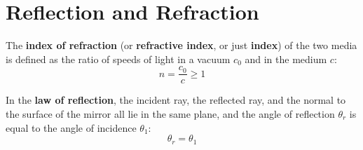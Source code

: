 \section{Reflection and Refraction}
%
The \textbf{index of refraction} (or \textbf{refractive index}, or just
\textbf{index}) of the two media is defined as the ratio of speeds of light in
a vacuum $c_0$ and in the medium $c$:
\begin{equation}
  n=\frac{c_0}c\geq 1
\end{equation}

%
%
%
In the \textbf{law of reflection}, the incident ray, the reflected ray, and the
normal to the surface of the mirror all lie in the same plane, and the angle of
reflection $\theta_r$ is equal to the angle of incidence $\theta_1$:
\begin{equation}
  \boxed{\theta_r=\theta_1}
\end{equation}
%  

%
%
%

